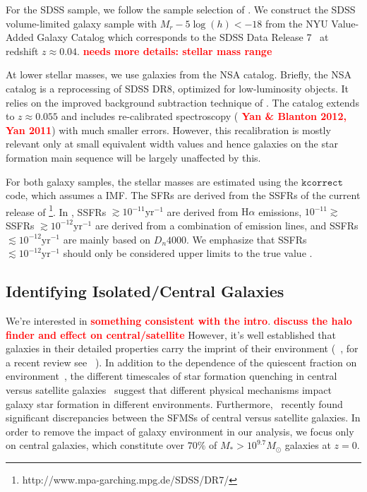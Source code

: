 \documentclass[preprint2,tighten]{aastex62}
\newcommand{\todo}[1]{{\bf \textcolor{red}{ #1}}}
\begin{document}
For the SDSS sample, we follow the sample selection of \citet{Tinkeretal2011}. 
We construct the SDSS volume-limited galaxy sample with $M_r - 5\log(h) < -18$ 
from the NYU Value-Added Galaxy Catalog \citep[VAGC;][]{Blantonetal2005} which 
corresponds to the SDSS Data Release 7~\citep[DR7;][]{Abazajianetal2009} at 
redshift $z \approx 0.04$. 
\todo{needs more details: stellar mass range}

At lower stellar masses, we use galaxies from the NSA catalog. Briefly, 
the NSA catalog is a reprocessing of SDSS DR8, optimized for low-luminosity 
objects. It relies on the improved background subtraction technique of 
\cite{blanton2011}. The catalog extends to $z \approx 0.055$ and includes 
re-calibrated spectroscopy (\todo{Yan \& Blanton 2012, Yan 2011}) with much
smaller errors. However, this recalibration is mostly relevant only at small 
equivalent width values and hence galaxies on the star formation main 
sequence will be largely unaffected by this.

For both galaxy samples, the stellar masses are estimated using the 
\citet{BlantonRoweis2007} $\mathtt{kcorrect}$ code, which assumes a 
\citep{Chabrier2003} IMF. The SFRs are derived from the SSFRs of the 
current release of 
\citet{Brinchmannetal2004catalog}\footnote{http://www.mpa-garching.mpg.de/SDSS/DR7/}. 
In \citet{Brinchmannetal2004catalog}, SSFRs 
$\gtrsim 10^{-11} \mathrm{yr}^{-1}$ are  derived from $\mathrm{H}\alpha$ 
emissions, $10^{-11}\gtrsim$ SSFRs $\gtrsim 10^{-12} \mathrm{yr}^{-1}$ 
are derived from a combination of emission lines, and SSFRs 
$\lesssim 10^{-12} \mathrm{yr}^{-1}$ are mainly based on $D_n4000$. 
We emphasize that SSFRs $\lesssim 10^{-12} \mathrm{yr}^{-1}$ should only be 
considered upper limits to the true value \citep{Salimetal2007}.

\subsection{Identifying Isolated/Central Galaxies}
We're interested in \todo{something consistent with the intro}. \todo{discuss the halo finder and effect on central/satellite}
However, it's well established that galaxies in their detailed properties
carry the imprint of their environment (~\citealp{hubble1936, oemler1974, dressler1980, balogh}, for a recent review see ~\citealp{blanton2009}). 
In addition to the dependence of the quiescent fraction on 
environment~\citep[\emph{e.g.}][\todo{more citations}]{peng2010,hahn2015}, the different 
timescales of star formation quenching in central versus satellite 
galaxies~\citep{wetzel2013,hahn2017a} suggest that different physical 
mechanisms impact galaxy star formation in different environments. 
Furthermore,~\cite{wang2018} recently 
found significant discrepancies between the SFMSs of central versus 
satellite galaxies. In order to remove the impact of galaxy environment
in our analysis, we focus only on central galaxies, which constitute 
over $70\%$ of $M_* > 10^{9.7}M_\odot$ galaxies at $z=0$. 
\end{document}
